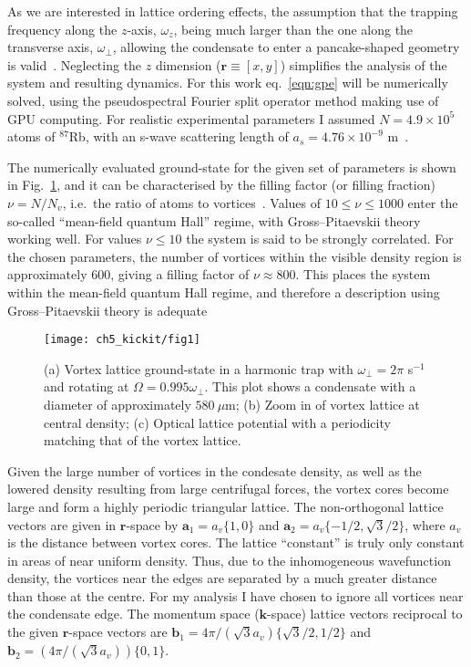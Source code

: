 As we are interested in lattice ordering effects, the assumption that the trapping frequency along the $z$-axis, $\omega_z$, being much larger than the one along the transverse axis, $\omega_\perp$, allowing the condensate to enter a pancake-shaped geometry is valid~\cite{BEC:Fetter_revmodphys_2009}. Neglecting the $z$ dimension ($\textbf{r}\equiv [x,y]$) simplifies the analysis of the system and resulting dynamics. For this work eq.~\eqref{eqn:gpe} will be numerically solved, using the pseudospectral Fourier split operator method making use of GPU computing\cite{NUMERICS}. For realistic experimental parameters I assumed  $N=4.9\times 10^5$ atoms of $^{87}$Rb, with an s-wave scattering length of $a_s=4.76\times10^{-9}$ m~\cite{AO:Roberts_prl_1998}.

The numerically evaluated ground-state for the given set of parameters is shown in Fig.~\ref{fig:vlatt_gnd}, and it can be characterised by the filling factor (or filling fraction) $\nu=N/N_v$, i.e.~the ratio of atoms to vortices~\cite{BEC:Fetter_revmodphys_2009}. Values of $10 \leq \nu \leq 1000$ enter the so-called ``mean-field quantum Hall'' regime, with Gross--Pitaevskii theory working well. For values $\nu \leq 10$ the system is said to be strongly correlated. For the chosen parameters, the number of vortices within the visible density region is approximately 600, giving a filling factor of $\nu \approx 800 $. This places the system within the mean-field quantum Hall regime, and therefore a description using Gross--Pitaevskii theory is adequate~\cite{Vtx:Schweikhard_prl_2004}

\begin{figure}[tb]
    \centering
    \texttt{[image: ch5\_kickit/fig1]}
    \caption[Comparison of vortex lattice and optical lattice structures.]{(a) Vortex lattice ground-state in a harmonic trap with $\omega_\perp=2\pi$ s$^{-1}$ and rotating at $\Omega=0.995\omega_\perp$. This plot shows a condensate with a diameter of approximately $580~\mu\textrm{m}$; (b) Zoom in of vortex lattice at central density; (c) Optical lattice potential with a periodicity matching that of the vortex lattice.}
    \label{fig:vlatt_gnd}
\end{figure}

Given the large number of vortices in the condesate density, as well as the lowered density resulting from large centrifugal forces, the vortex cores become large and form a highly periodic triangular lattice. The non-orthogonal lattice vectors are given in $\mathbf{r}$-space by $\mathbf{a}_1 = a_v\{1,0\}$ and $\mathbf{a}_2 = a_v\{-1/2, \sqrt{3}/2\}$, where $a_v$ is the distance between vortex cores. The lattice ``constant'' is truly only constant in areas of near uniform density. Thus, due to the inhomogeneous wavefunction density, the vortices near the edges are separated by a much greater distance than those at the centre. For my analysis I have chosen to ignore all vortices near the condensate edge. The momentum space ($\mathbf{k}$-space) lattice vectors reciprocal to the given $\mathbf{r}$-space vectors are $\mathbf{b}_1 = 4\pi/(\sqrt{3}a_v)\{\sqrt{3}/2,1/2\}$ and $\mathbf{b}_2 = (4\pi/(\sqrt{3}a_v))\{0,1\}$.

